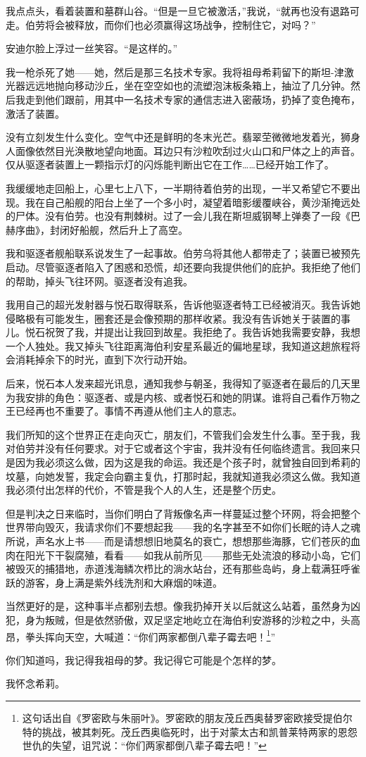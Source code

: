 \documentclass[AutoFakeBold=true]{book}
\begin{document}
{我点点头，看着装置和墓群山谷。``但是一旦它被激活，''我说，``就再也没有退路可走。伯劳将会被释放，而你们也必须赢得这场战争，控制住它，对吗？''

安迪尔脸上浮过一丝笑容。``是这样的。''

我一枪杀死了她——她，然后是那三名技术专家。我将祖母希莉留下的斯坦-津激光器远远地抛向移动沙丘，坐在空空如也的流塑泡沫板条箱上，抽泣了几分钟。然后我走到他们跟前，用其中一名技术专家的通信志进入密蔽场，扔掉了变色掩布，激活了装置。

没有立刻发生什么变化。空气中还是鲜明的冬末光芒。翡翠茔微微地发着光，狮身人面像依然目光涣散地望向地面。耳边只有沙粒吹刮过火山口和尸体之上的声音。仅从驱逐者装置上一颗指示灯的闪烁能判断出它在工作……已经开始工作了。

我缓缓地走回船上，心里七上八下，一半期待着伯劳的出现，一半又希望它不要出现。我在自己船舰的阳台上坐了一个多小时，凝望着暗影缓覆峡谷，黄沙渐掩远处的尸体。没有伯劳。也没有荆棘树。过了一会儿我在斯坦威钢琴上弹奏了一段《巴赫序曲》，封闭好船舰，然后升上了高空。

我和驱逐者舰船联系说发生了一起事故。伯劳乌将其他人都带走了；装置已被预先启动。尽管驱逐者陷入了困惑和恐慌，却还要向我提供他们的庇护。我拒绝了他们的帮助，掉头飞往环网。驱逐者没有追我。

我用自己的超光发射器与悦石取得联系，告诉他驱逐者特工已经被消灭。我告诉她侵略极有可能发生，圈套还是会像预期的那样收紧。我没有告诉她关于装置的事儿。悦石祝贺了我，并提出让我回到故星。我拒绝了。我告诉她我需要安静，我想一个人独处。我又掉头飞往距离海伯利安星系最近的偏地星球，我知道这趟旅程将会消耗掉余下的时光，直到下次行动开始。

后来，悦石本人发来超光讯息，通知我参与朝圣，我得知了驱逐者在最后的几天里为我安排的角色：驱逐者、或是内核、或者悦石和她的阴谋。谁将自己看作万物之王已经再也不重要了。事情不再遵从他们主人的意志。

我们所知的这个世界正在走向灭亡，朋友们，不管我们会发生什么事。至于我，我对伯劳并没有任何要求。对于它或者这个宇宙，我并没有任何临终遗言。我回来只是因为我必须这么做，因为这是我的命运。我还是个孩子时，就曾独自回到希莉的坟墓，向她发誓，我定会向霸主复仇，打那时起，我就知道我必须这么做。我知道我必须付出怎样的代价，不管是我个人的人生，还是整个历史。

但是判决之日来临时，当你们明白了背叛像名声一样蔓延过整个环网，将会把整个世界带向毁灭，我请求你们不要想起我——我的名字甚至不如你们长眠的诗人之魂所说，声名水上书——而是请想想旧地莫名的衰亡，想想那些海豚，它们苍灰的血肉在阳光下干裂腐殖，看看——如我从前所见——那些无处流浪的移动小岛，它们被毁灭的捕猎地，赤道浅海鳞次栉比的淌水站台，还有那些岛屿，身上载满狂呼雀跃的游客，身上满是紫外线洗剂和大麻烟的味道。

当然更好的是，这种事半点都别去想。像我扔掉开关以后就这么站着，虽然身为凶犯，身为叛贼，但是依然骄傲，双足坚定地屹立在海伯利安游移的沙粒之中，头高昂，拳头挥向天空，大喊道：``你们两家都倒八辈子霉去吧！\footnote{这句话出自《罗密欧与朱丽叶》。罗密欧的朋友茂丘西奥替罗密欧接受提伯尔特的挑战，被其刺死。茂丘西奥临死时，出于对蒙太古和凯普莱特两家的恩怨世仇的失望，诅咒说：``你们两家都倒八辈子霉去吧！''}''

你们知道吗，我记得我祖母的梦。我记得它可能是个怎样的梦。

我怀念希莉。}
\end{document}
